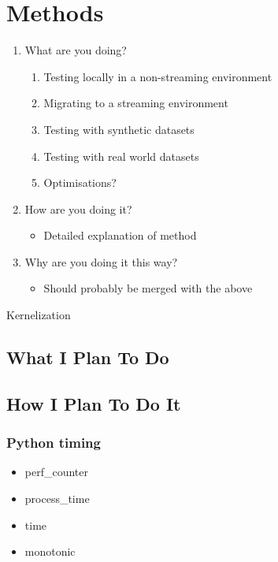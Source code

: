 \section{Methods}

\begin{enumerate}
    \item What are you doing?
    \begin{enumerate}
        \item Testing locally in a non-streaming environment
        \item Migrating to a streaming environment
        \item Testing with synthetic datasets
        \item Testing with real world datasets
        \item Optimisations?
    \end{enumerate}
    \item How are you doing it?
    \begin{itemize}
        \item Detailed explanation of method
    \end{itemize}
    \item Why are you doing it this way?
    \begin{itemize}
        \item Should probably be merged with the above
    \end{itemize}
\end{enumerate}

\begin{algorithm}[H]
    \DontPrintSemicolon

\caption{Kernelization}
\end{algorithm}

\subsection{What I Plan To Do}

\subsection{How I Plan To Do It}

\subsubsection{Python timing}

\begin{itemize}
    \item perf\_counter
    \item process\_time
    \item time
    \item monotonic
\end{itemize}

